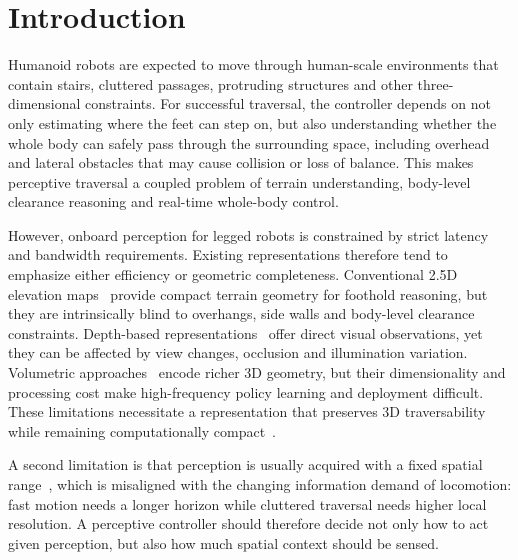 \documentclass[letterpaper, 10 pt, conference]{ieeeconf/ieeeconf}
\begin{document}
\section{Introduction}
Humanoid robots are expected to move through human-scale environments that contain stairs, cluttered passages, protruding structures and other three-dimensional constraints. For successful traversal, the controller depends on not only estimating where the feet can step on, but also understanding whether the whole body can safely pass through the surrounding space, including overhead and lateral obstacles that may cause collision or loss of balance. This makes perceptive traversal a coupled problem of terrain understanding, body-level clearance reasoning and real-time whole-body control.

However, onboard perception for legged robots is constrained by strict latency and bandwidth requirements. Existing representations therefore tend to emphasize either efficiency or geometric completeness. Conventional 2.5D elevation maps~\cite{Fankhauser2014RobotCentricElevationMapping,Fankhauser2018ProbabilisticTerrainMapping,ElevationMap_GPU_2022,long2025learning,wang2025beamdojo,ren2025vb,he2025attention,videomimic,Multi-Layer_ElevationMap_2025,Roth_2025_LearnedPerceptiveForwardDynamicsModel,Zhang_2026_AME2} provide compact terrain geometry for foothold reasoning, but they are intrinsically blind to overhangs, side walls and body-level clearance constraints. Depth-based representations~\cite{Li_2024_MOVE,zhuang2024humanoidRobot,zhuang2024humanoid,Yu_2025_START,Castillo_2025_LearningTerrainAwareBipedalLocomotion,Solano_2025_StandWalkNavigate,Sun_2025_DPL,Wang_2025_LocoMamba,zhu2026hiking} offer direct visual observations, yet they can be affected by view changes, occlusion and illumination variation. Volumetric approaches~\cite{Ben_2025_Gallant,Niijima_2025_Real-timeMulti-PlaneSegmentation,Wang_2025_Omni-Perception} encode richer 3D geometry, but their dimensionality and processing cost make high-frequency policy learning and deployment difficult. These limitations necessitate a representation that preserves 3D traversability while remaining computationally compact~\cite{2020arXiv200716100T,2018arXiv181205784L,2022arXiv220108117M}.

A second limitation is that perception is usually acquired with a fixed spatial range~\cite{Ben_2025_Gallant,Multi-Layer_ElevationMap_2025,long2025learning}, which is misaligned with the changing information demand of locomotion: fast motion needs a longer horizon while cluttered traversal needs higher local resolution. A perceptive controller should therefore decide not only how to act given perception, but also how much spatial context should be sensed.
\end{document}

